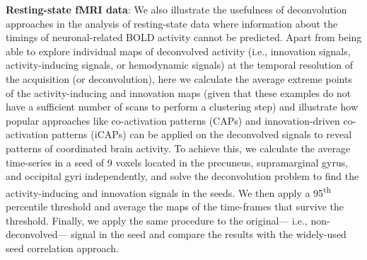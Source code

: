 \textbf{Resting-state fMRI data}: We also illustrate the usefulness of
deconvolution approaches in the analysis of resting-state data where information
about the timings of neuronal-related BOLD activity cannot be predicted. Apart
from being able to explore individual maps of deconvolved activity (i.e.,
innovation signals, activity-inducing signals, or hemodynamic signals) at the
temporal resolution of the acquisition (or deconvolution), here we calculate the
average extreme points of the activity-inducing and innovation
maps (given that these examples do not have a sufficient number of scans to
perform a clustering step) and illustrate how popular approaches like
co-activation patterns
(CAPs)\citep{Tagliazucchi2012,Liu2018Coactivationpatterns} and innovation-driven
co-activation patterns (iCAPs) \citep{Karahanoglu2015Transientbrainactivity} can
be applied on the deconvolved signals to reveal patterns of coordinated brain
activity. To achieve this, we calculate the average time-series in a seed of 9
voxels located in the precuneus, supramarginal gyrus, and occipital gyri
independently, and solve the deconvolution problem to find the activity-inducing
and innovation signals in the seeds. We then apply a 95\textsuperscript{th}
percentile threshold and average the maps of the time-frames that survive the
threshold. Finally, we apply the same procedure to the original--- i.e.,
non-deconvolved--- signal in the seed and compare the results with the
widely-used seed correlation approach.